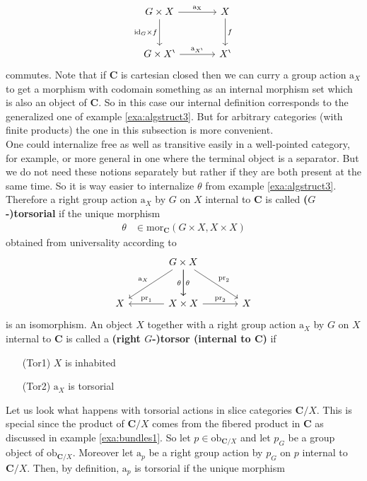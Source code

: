 \begin{exa}
\begin{enumerate}
\[
\begin{tikzcd}[sep=large]
  G
  \times
  X
  \arrow{r}{\mathrm{a_{X}}}
  \arrow[swap]{d}{\mathrm{id}_{G} \times f}
  &
  X
  \arrow{d}{f}
  \\
  G
  \times
  X^{\backprime}
  \arrow{r}{\mathrm{a}_{X^{\backprime}}}
  &
  X^{\backprime}
\end{tikzcd}
\]
commutes. Note that if $\mathbf{C}$ is cartesian closed then we can curry a group action $\mathrm{a}_{X}$ to get a morphism with codomain something as an {\glqq}internal morphism set{\grqq} which is also an object of $\mathbf{C}$. So in this case our internal definition corresponds to the generalized one of example \ref{exa:algstruct3}. But for arbitrary categories (with finite products) the one in this subsection is more convenient.
\\
One could internalize free as well as transitive easily in a well-pointed category, for example, or more general in one where the terminal object is a separator. But we do not need these notions separately but rather if they are both present at the same time. So it is way easier to internalize $\theta$ from example \ref{exa:algstruct3}. Therefore a right group action $\mathrm{a}_{X}$ by $G$ on $X$ internal to $\mathbf{C}$ is called \textbf{($G$-)torsorial} if the unique morphism
\begin{align*}
  \theta
  &\in
  \mathrm{mor}_{\mathbf{C}}
  \left(
    G
    \times
    X,
    X
    \times
    X
  \right)
\end{align*}
obtained from universality according to
\[
\begin{tikzcd}[sep=large]
  &
  G
  \times
  X
  \arrow{dr}{\mathrm{pr}_{2}}
  \arrow{d}{\theta}
  \arrow[swap]{d}{\theta}
  \arrow[swap]{dl}{\mathrm{a}_{X}}
  &
  \\
  X
  &
  X
  \times
  X
  \arrow{r}{\mathrm{pr}_{2}}
  \arrow[swap]{l}{\mathrm{pr}_{1}}
  &
  X
\end{tikzcd}
\]
is an isomorphism. An object $X$ together with a right group action $\mathrm{a}_{X}$ by $G$ on $X$ internal to $\mathbf{C}$ is called a \textbf{(right $G$-)torsor (internal to $\mathbf{C}$)} if
\begin{enumerate}
\item[(Tor1)]
$X$ is inhabited
\item[(Tor2)]
$\mathrm{a}_{X}$ is torsorial
\end{enumerate}
Let us look what happens with torsorial actions in slice categories $\mathbf{C} \slash X$. This is special since the product of $\mathbf{C} \slash X$ comes from the fibered product in $\mathbf{C}$ as discussed in example \ref{exa:bundles1}. So let $p \in \mathrm{ob}_{\mathbf{C} \slash X}$ and let $p_{G}$ be a group object of $\mathrm{ob}_{\mathbf{C} \slash X}$. Moreover let $\mathrm{a}_{p}$ be a right group action by $p_{G}$ on $p$ internal to $\mathbf{C} \slash X$. Then, by definition, $\mathrm{a}_{p}$ is torsorial if the unique morphism

\end{enumerate}
\end{exa}
